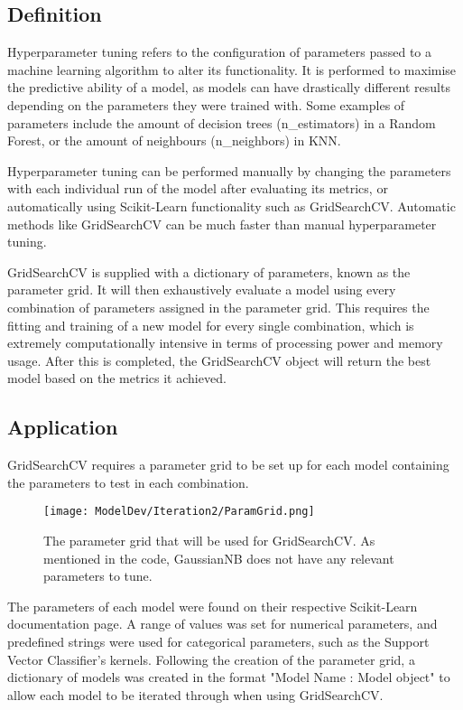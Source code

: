\subsection{Definition}
Hyperparameter tuning refers to the configuration of parameters passed to a machine learning algorithm to alter its 
functionality. It is performed to maximise the predictive ability of a model, as models can have drastically different 
results depending on the parameters they were trained with. Some examples of parameters include the amount of decision trees 
(n\_estimators) in a Random Forest, or the amount of neighbours (n\_neighbors) in KNN.

\para Hyperparameter tuning can be performed manually by changing the parameters with each individual run of the model after evaluating 
its metrics, or automatically using Scikit-Learn functionality such as GridSearchCV. Automatic methods like GridSearchCV can be much faster than 
manual hyperparameter tuning.

\para GridSearchCV is supplied with a dictionary of parameters, known as the parameter grid. It will then exhaustively evaluate a model
using every combination of parameters assigned in the parameter grid. This requires the fitting and training of a new model for every single 
combination, which is extremely computationally intensive in terms of processing power and memory usage. After this is completed, the GridSearchCV 
object will return the best model based on the metrics it achieved.

\subsection{Application}\label{ASec:HyperparameterApplication}
GridSearchCV requires a parameter grid to be set up for each model containing the parameters to test in each combination. 

\begin{figure}[H]
    \centering 
    \texttt{[image: ModelDev/Iteration2/ParamGrid.png]}
    \caption{The parameter grid that will be used for GridSearchCV. As mentioned in the code, GaussianNB does not have any relevant 
    parameters to tune.}
    \label{fig:ParamGrid}
\end{figure}

\para The parameters of each model were found on their respective Scikit-Learn documentation page. A range of values was set for numerical 
parameters, and predefined strings were used for categorical parameters, such as the Support Vector Classifier's kernels. Following the creation 
of the parameter grid, a dictionary of models was created in the format "{Model Name} : {Model object}" to allow each model to be iterated through 
when using GridSearchCV.

